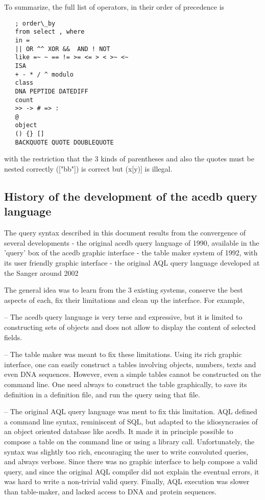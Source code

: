 \documentclass[11pt]{article}
\newcommand{\BL}{\begin{lstlisting}}
\begin{document}
To summarize, the full list of operators, in their order of precedence is
\BL
   ; order\_by
   from select , where
   in = 
   || OR ^^ XOR &&  AND ! NOT
   like =~ ~ == != >= <= > < >~ <~
   ISA
   + - * / ^ modulo
   class
   DNA PEPTIDE DATEDIFF 
   count
   >> -> # => :
   @
   object
   () {} []
   BACKQUOTE QUOTE DOUBLEQUOTE 
\end{lstlisting}

with the restriction that the 3 kinds of parentheses and 
also the quotes must be nested correctly  (["bb"]) is correct but (x[y)] is illegal.

\subsection{History of the development of the acedb query language}

The query syntax described in this document results from the convergence of several developments
   - the original acedb query language of 1990, available in the 'query' box of the acedb graphic interface
   - the table maker system of 1992, with its user friendly graphic interface 
   - the original AQL query language developed at the Sanger around 2002

The general idea was to learn from the 3 existing systems, conserve the best aspects of each, fix their limitations and clean up the interface. For example, 

-- The acedb query language is very terse and expressive, but it is limited to constructing sets of objects and does not allow to display the content of selected fields.

-- The table maker was meant to fix these limitations. Using its rich graphic interface, one can easily construct a tables involving objects, numbers, texts and even DNA sequences. However, even a simple tables cannot be constructed on the command line. One need always to construct the table graphically, to save its definition in a definition file, and run the query using that file. 

-- The original AQL query language was ment to fix this limitation. AQL defined a command line syntax, reminiscent of SQL, but adapted to the idiosyncrasies of an object oriented database like acedb. It made it in principle possible to compose a table on the command line or using a library call. Unfortunately, the syntax was slightly too rich, encouraging the user to write convoluted queries, and always verbose. Since there was no graphic interface to help compose a valid query, and since the original AQL compiler did not explain the eventual errors, it was hard to write a non-trivial valid query. Finally, AQL execution was slower than table-maker, and lacked access to DNA and protein sequences. 
\end{document}
